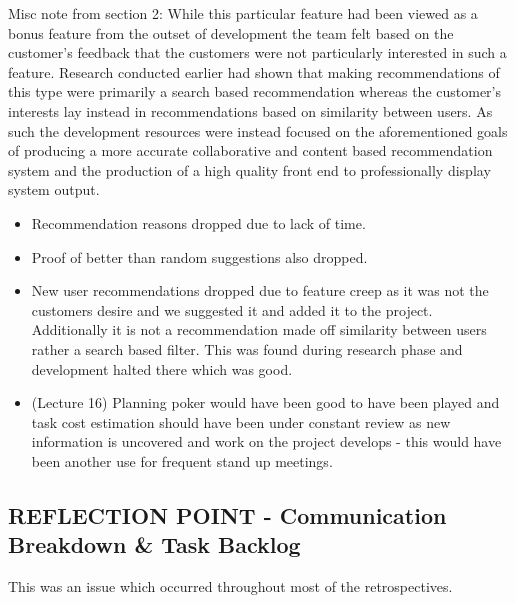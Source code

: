 \documentclass{l3proj}
\begin{document}
Misc note from section 2:
While this particular feature had been viewed as a bonus feature from the outset of development the team felt based on the customer’s feedback that the customers were not particularly interested in such a feature. Research conducted earlier had shown that making recommendations of this type were primarily a search based recommendation whereas the customer’s interests lay instead in recommendations based on similarity between users. As such the development resources were instead focused on the aforementioned goals of producing a more accurate collaborative and content based recommendation system and the production of a high quality front end to professionally display system output. 
\begin{itemize}
\item Recommendation reasons dropped due to lack of time.
\item Proof of better than random suggestions also dropped.
\item New user recommendations dropped due to feature creep as it was not the customers desire and we suggested it and added it to the project. Additionally it is not a recommendation made off similarity between users rather a search based filter. This was found during research phase and development halted there which was good.
\item (Lecture 16) Planning poker would have been good to have been played and task cost estimation should have been under constant review as new information is uncovered and work on the project develops - this would have been another use for frequent stand up meetings.
\end{itemize}


\subsection{REFLECTION POINT - Communication Breakdown \& Task Backlog}
\label{sec:communicationbreakdown}
This was an issue which occurred throughout most of the retrospectives.
\end{document}
